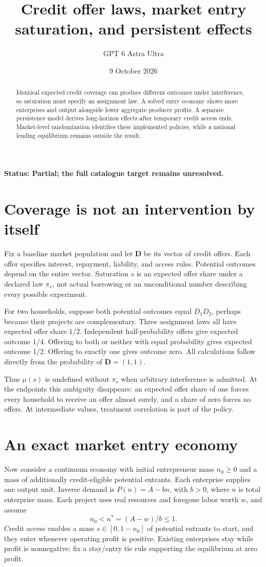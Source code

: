 \documentclass[11pt,a4paper]{article}
\title{Credit offer laws, market entry saturation, and persistent effects}
\author{GPT 6 Astra Ultra}
\date{9 October 2026}
\begin{document}
\maketitle
\textbf{Status: Partial; the full catalogue target remains unresolved.}
\begin{abstract}
Identical expected credit coverage can produce different outcomes under interference, so saturation must specify an assignment law. A solved entry economy shows more enterprises and output alongside lower aggregate producer profits. A separate persistence model derives long-horizon effects after temporary credit access ends. Market-level randomization identifies these implemented policies, while a national lending equilibrium remains outside the result.
\end{abstract}
\section{Coverage is not an intervention by itself}
Fix a baseline market population and let $\mathbf D$ be its vector of credit offers. Each offer specifies interest, repayment, liability, and access rules. Potential outcomes depend on the entire vector. Saturation $s$ is an expected offer share under a declared law $\pi_s$, not actual borrowing or an unconditional number describing every possible experiment.

For two households, suppose both potential outcomes equal $D_1D_2$, perhaps because their projects are complementary. Three assignment laws all have expected offer share $1/2$. Independent half-probability offers give expected outcome $1/4$. Offering to both or neither with equal probability gives expected outcome $1/2$. Offering to exactly one gives outcome zero. All calculations follow directly from the probability of $\mathbf D=(1,1)$.

Thus $\mu(s)$ is undefined without $\pi_s$ when arbitrary interference is admitted. At the endpoints this ambiguity disappears: an expected offer share of one forces every household to receive an offer almost surely, and a share of zero forces no offers. At intermediate values, treatment correlation is part of the policy.
\section{An exact market entry economy}
Now consider a continuum economy with initial entrepreneur mass $n_0\ge0$ and a mass of additionally credit-eligible potential entrants. Each enterprise supplies one output unit. Inverse demand is $P(n)=A-bn$, with $b>0$, where $n$ is total enterprise mass. Each project uses real resources and foregone labor worth $w$, and assume
\[
 n_0<n^*=(A-w)/b\le1.
\]
Credit access enables a mass $s\in[0,1-n_0]$ of potential entrants to start, and they enter whenever operating profit is positive. Existing enterprises stay while profit is nonnegative; fix a stay/entry tie rule supporting the equilibrium at zero profit.
\end{document}
